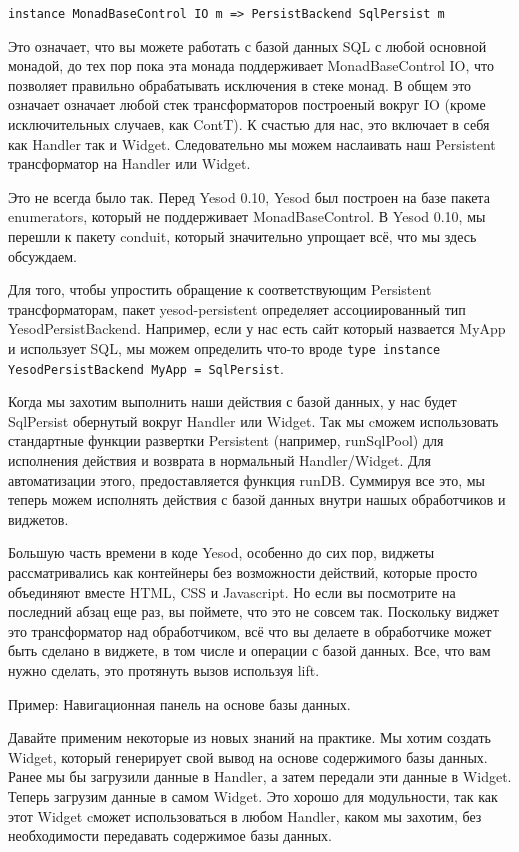 \begin{lstlisting}
instance MonadBaseControl IO m => PersistBackend SqlPersist m
\end{lstlisting}

Это означает, что вы можете работать с базой данных SQL с любой основной монадой, до тех пор пока эта монада поддерживает MonadBaseControl IO, что позволяет правильно обрабатывать исключения в стеке монад. В общем это означает означает любой стек трансформаторов построеный вокруг IO (кроме исключительных случаев, как ContT). К счастью для нас, это включает в себя как Handler так и Widget. Следовательно мы можем наслаивать наш Persistent трансформатор на Handler или Widget.

Это не всегда было так. Перед Yesod 0.10, Yesod был построен на базе пакета enumerators, который не поддерживает MonadBaseControl. В Yesod 0.10, мы перешли к пакету conduit, который значительно упрощает всё, что мы здесь обсуждаем.

Для того, чтобы упростить обращение к соответствующим Persistent трансформаторам, пакет yesod-persistent определяет ассоциированный тип YesodPersistBackend. Например, если у нас есть сайт который назвается MyApp и использует SQL, мы можем определить что-то вроде \lstinline'type instance YesodPersistBackend MyApp = SqlPersist'.

Когда мы захотим выполнить наши действия с базой данных, у нас будет SqlPersist обернутый вокруг Handler или Widget. Так мы cможем использовать стандартные функции развертки Persistent (например, runSqlPool) для исполнения действия и возврата в нормальный Handler/Widget. Для автоматизации этого, предоставляется функция runDB. Суммируя все это, мы теперь можем исполнять действия с базой данных внутри нашых обработчиков и виджетов.

Большую часть времени в коде Yesod, особенно до сих пор, виджеты рассматривались как контейнеры без возможности действий, которые просто объединяют вместе HTML, CSS и Javascript. Но если вы посмотрите на последний абзац еще раз, вы поймете, что это не совсем так. Поскольку виджет это трансформатор над обработчиком, всё что вы делаете в обработчике может быть сделано в виджете, в том числе и операции с базой данных. Все, что вам нужно сделать, это протянуть вызов используя lift.

Пример: Навигационная панель на основе базы данных.

Давайте применим некоторые из новых знаний на практике. Мы хотим создать Widget, который генерирует свой вывод на основе содержимого базы данных. Ранее мы бы загрузили данные в Handler, а затем передали эти данные в Widget. Теперь загрузим данные в самом Widget. Это хорошо для модульности, так как этот Widget cможет использоваться в любом Handler, каком мы захотим, без необходимости передавать содержимое базы данных.


